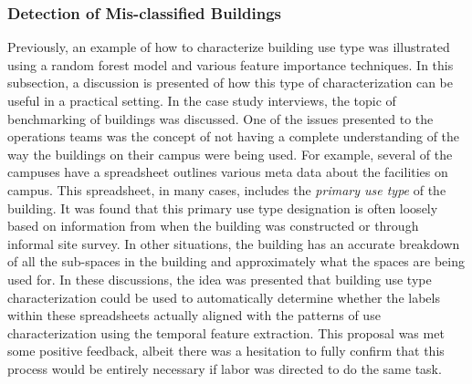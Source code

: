 \subsubsection{Detection of Mis-classified Buildings}
\label{sec:clustering}

Previously, an example of how to characterize building use type was illustrated using a random forest model and various feature importance techniques. In this subsection, a discussion is presented of how this type of characterization can be useful in a practical setting. In the case study interviews, the topic of benchmarking of buildings was discussed. One of the issues presented to the operations teams was the concept of not having a complete understanding of the way the buildings on their campus were being used. For example, several of the campuses have a spreadsheet outlines various meta data about the facilities on campus. This spreadsheet, in many cases, includes the \emph{primary use type} of the building. It was found that this primary use type designation is often loosely based on information from when the building was constructed or through informal site survey. In other situations, the building has an accurate breakdown of all the sub-spaces in the building and approximately what the spaces are being used for. In these discussions, the idea was presented that building use type characterization could be used to automatically determine whether the labels within these spreadsheets actually aligned with the patterns of use characterization using the temporal feature extraction. This proposal was met some positive feedback, albeit there was a hesitation to fully confirm that this process would be entirely necessary if labor was directed to do the same task.

